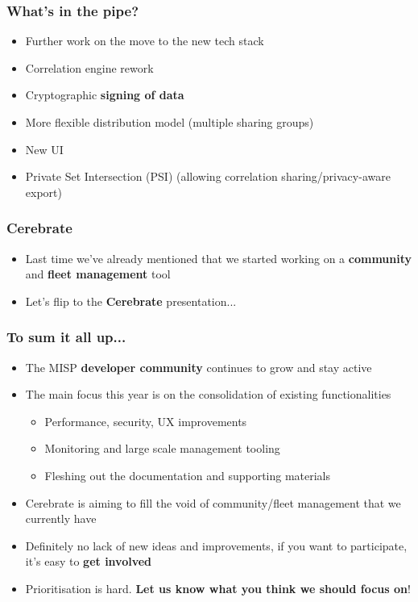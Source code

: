 \begin{frame}
\frametitle{What's in the pipe?}
\begin{itemize}
	\item Further work on the move to the new tech stack
        \item Correlation engine rework
        \item Cryptographic {\bf signing of data}
        \item More flexible distribution model (multiple sharing groups)
        \item New UI
        \item Private Set Intersection (PSI) (allowing correlation sharing/privacy-aware export)
\end{itemize}
\end{frame}

\begin{frame}
\frametitle{Cerebrate}
\begin{itemize}
        \item Last time we've already mentioned that we started working on a {\bf community} and {\bf fleet management} tool
	\item Let's flip to the {\bf Cerebrate} presentation...
\end{itemize}
\end{frame}

\begin{frame}
  \frametitle{To sum it all up...}
  \begin{itemize}
     \item The MISP {\bf developer community} continues to grow and stay active
     \item The main focus this year is on the consolidation of existing functionalities
     \begin{itemize}
          \item Performance, security, UX improvements
          \item Monitoring and large scale management tooling
          \item Fleshing out the documentation and supporting materials
     \end{itemize}
     \item Cerebrate is aiming to fill the void of community/fleet management that we currently have
     \item Definitely no lack of new ideas and improvements, if you want to participate, it's easy to {\bf get involved}
     \item Prioritisation is hard. {\bf Let us know what you think we should focus on}!
  \end{itemize}
\end{frame}

